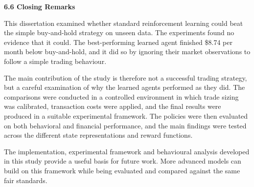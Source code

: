 \textbf{6.6 Closing Remarks}

This dissertation examined whether standard reinforcement learning could
beat the simple buy-and-hold strategy on unseen data. The experiments
found no evidence that it could. The best-performing learned agent
finished \$8.74 per month below buy-and-hold, and it did so by ignoring
their market observations to follow a simple trading behaviour.

The main contribution of the study is therefore not a successful trading
strategy, but a careful examination of why the learned agents performed
as they did. The comparisons were conducted in a controlled environment
in which trade sizing was calibrated, transaction costs were applied,
and the final results were produced in a suitable experimental
framework. The policies were then evaluated on both behavioral and
financial performance, and the main findings were tested across the
different state representations and reward functions.

The implementation, experimental framework and behavioural analysis
developed in this study provide a useful basis for future work. More
advanced models can build on this framework while being evaluated and
compared against the same fair standards.
